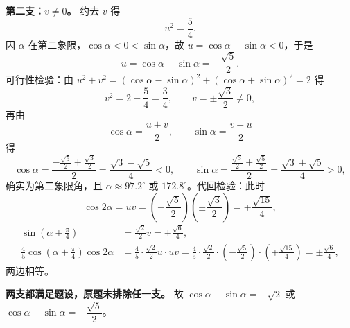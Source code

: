 \begin{answer}
\textbf{第二支：$v\neq0$。} 约去 $v$ 得
\nopagebreak[4]
\[u^2=\frac54 .\]
因 $\alpha$ 在第二象限，$\cos\alpha<0<\sin\alpha$，故 $u=\cos\alpha-\sin\alpha<0$，于是
\nopagebreak[4]
\[u=\cos\alpha-\sin\alpha=-\frac{\sqrt5}2 .\]
可行性检验：由 $u^2+v^2=(\cos\alpha-\sin\alpha)^2+(\cos\alpha+\sin\alpha)^2=2$ 得
\nopagebreak[4]
\[v^2=2-\frac54=\frac34,\qquad v=\pm\frac{\sqrt3}2\neq 0,\]
再由
\nopagebreak[4]
\[\cos\alpha=\frac{u+v}2,\qquad \sin\alpha=\frac{v-u}2\]
得
\nopagebreak[4]
\[\cos\alpha=\frac{-\frac{\sqrt5}2+\frac{\sqrt3}2}{2}=\frac{\sqrt3-\sqrt5}4<0,\qquad
\sin\alpha=\frac{\frac{\sqrt3}2+\frac{\sqrt5}2}{2}=\frac{\sqrt3+\sqrt5}4>0,\]
确实为第二象限角，且 $\alpha\approx 97.2^\circ$ 或 $172.8^\circ$。代回检验：此时
\nopagebreak[4]
\[\cos2\alpha=uv=\left(-\frac{\sqrt5}2\right)\left(\pm\frac{\sqrt3}2\right)=\mp\frac{\sqrt{15}}4,\]
\nopagebreak[4]
\[\begin{aligned}
\sin\left(\alpha+\frac\pi4\right)&=\frac{\sqrt2}2v=\pm\frac{\sqrt6}4,\\
\frac45\cos\left(\alpha+\frac\pi4\right)\cos2\alpha
&=\frac45\cdot\frac{\sqrt2}2u\cdot uv
=\frac45\cdot\frac{\sqrt2}2\cdot\left(-\frac{\sqrt5}2\right)\cdot\left(\mp\frac{\sqrt{15}}4\right)=\pm\frac{\sqrt6}4,
\end{aligned}\]
两边相等。

\textbf{两支都满足题设，原题未排除任一支。} 故
$\cos\alpha-\sin\alpha=-\sqrt2$ 或 $\cos\alpha-\sin\alpha=-\dfrac{\sqrt5}2$。



\end{answer}
